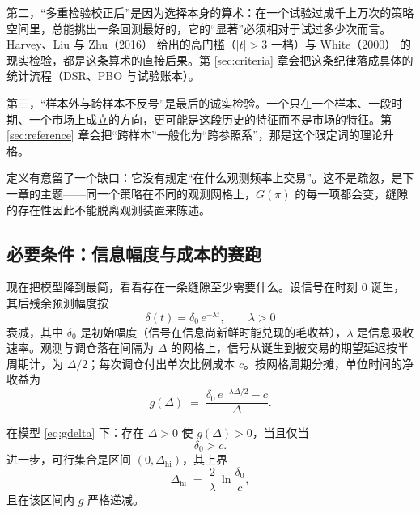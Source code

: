 第二，“多重检验校正后”是因为选择本身的算术：在一个试验过成千上万次的策略空间里，总能挑出一条回测最好的，它的“显著”必须相对于试过多少次而言。Harvey、Liu 与 Zhu（2016）\cite{harveylz2016} 给出的高门槛（$|t|>3$ 一档）与 White（2000）\cite{white2000} 的现实检验，都是这条算术的直接后果。第 \ref{sec:criteria} 章会把这条纪律落成具体的统计流程（DSR、PBO 与试验账本）。

第三，“样本外与跨样本不反号”是最后的诚实检验。一个只在一个样本、一段时期、一个市场上成立的方向，更可能是这段历史的特征而不是市场的特征。第 \ref{sec:reference} 章会把“跨样本”一般化为“跨参照系”，那是这个限定词的理论升格。

定义有意留了一个缺口：它没有规定“在什么观测频率上交易”。这不是疏忽，是下一章的主题——同一个策略在不同的观测网格上，$G(\pi)$ 的每一项都会变，缝隙的存在性因此不能脱离观测装置来陈述。

\subsection{必要条件：信息幅度与成本的赛跑}\label{sec:necessary}

现在把模型降到最简，看看存在一条缝隙至少需要什么。设信号在时刻 $0$ 诞生，其后残余预测幅度按
\begin{equation}
  \delta(t) = \delta_0\,e^{-\lambda t}, \qquad \lambda>0
\end{equation}
衰减，其中 $\delta_0$ 是初始幅度（信号在信息尚新鲜时能兑现的毛收益），$\lambda$ 是信息吸收速率。观测与调仓落在间隔为 $\Delta$ 的网格上，信号从诞生到被交易的期望延迟按半周期计，为 $\Delta/2$；每次调仓付出单次比例成本 $c$。按网格周期分摊，单位时间的净收益为
\begin{equation}
  g(\Delta) \;=\; \frac{\delta_0\,e^{-\lambda\Delta/2} - c}{\Delta}.
  \label{eq:gdelta}
\end{equation}

\begin{proposition}[缝隙存在的必要条件]\label{prop:necessary}
在模型 \eqref{eq:gdelta} 下：存在 $\Delta>0$ 使 $g(\Delta)>0$，当且仅当
\begin{equation}
  \delta_0 > c .
\end{equation}
进一步，可行集合是区间 $(0,\Delta_{\mathrm{hi}})$，其上界
\begin{equation}
  \Delta_{\mathrm{hi}} \;=\; \frac{2}{\lambda}\,\ln\!\frac{\delta_0}{c},
  \label{eq:deltahi}
\end{equation}
且在该区间内 $g$ 严格递减。
\end{proposition}

